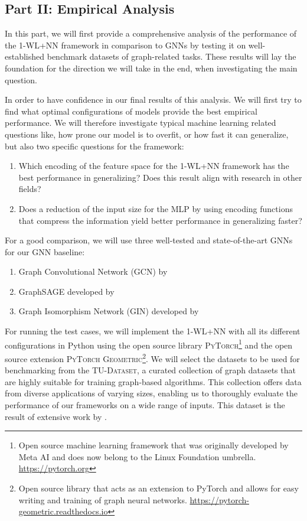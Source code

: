 \documentclass[11pt, dvipsnames, DIV=12]{scrreprt}
\theoremstyle{definition}
\newcommand{\wlnn}{\text{1-WL+NN }}
\begin{document}
\subsection{Part II: Empirical Analysis}
In this part, we will first provide a comprehensive analysis of the performance of the 1-WL+NN framework in comparison to GNNs by testing it on well-established benchmark datasets of graph-related tasks. These results will lay the foundation for the direction we will take in the end, when investigating the main question.

In order to have confidence in our final results of this analysis. We will first try to find what optimal configurations of \wlnn models provide the best empirical performance. We will therefore investigate typical machine learning related questions like, how prone our model is to overfit, or how fast it can generalize, but also two specific questions for the framework:
\begin{enumerate}[label=Q\arabic*)]
    \item Which encoding of the feature space for the 1-WL+NN framework has the best performance in generalizing? Does this result align with research in other fields?
    \item Does a reduction of the input size for the MLP by using encoding functions that compress the information yield better performance in generalizing faster?
\end{enumerate}
For a good comparison, we will use three well-tested and state-of-the-art GNNs for our GNN baseline:
\begin{enumerate}
    \item Graph Convolutional Network (GCN) by \cite{Kip+2017}
    \item GraphSAGE developed by \cite{Ham+2017}
    \item Graph Isomorphism Network (GIN) developed by \cite{Xu2018}
\end{enumerate}

For running the test cases, we will implement the 1-WL+NN with all its different configurations in Python using the open source library \textsc{PyTorch}\footnote{Open source machine learning framework that was originally developed by Meta AI and does now belong to the Linux Foundation umbrella. \href{https://pytorch.org}{https://pytorch.org}} and the open source extension \textsc{PyTorch Geometric}\footnote{Open source library that acts as an extension to PyTorch and allows for easy writing and training of graph neural networks. \href{https://pytorch-geometric.readthedocs.io/en/latest}{https://pytorch-geometric.readthedocs.io}}.
We will select the datasets to be used for benchmarking from the \textsc{TU-Dataset}, a curated collection of graph datasets that are highly suitable for training graph-based algorithms. This collection offers data from diverse applications of varying sizes, enabling us to thoroughly evaluate the performance of our frameworks on a wide range of inputs. This dataset is the result of extensive work by \cite{Mor+2020}.
\end{document}
